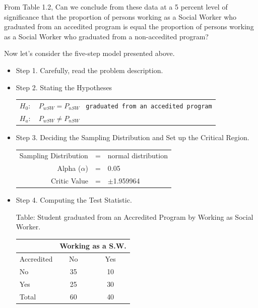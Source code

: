 \documentclass[11pt, chapterprefix=true]{scrbook}\usepackage[]{graphicx}\usepackage[]{color}
\begin{document}
From Table 1.2, Can we conclude from these data at a 5 percent level of significance that the proportion of persons working as a Social Worker who graduated from an accedited program is equal the proportion of persons working as a Social Worker who graduated from a non-accedited program?

Now let's consider the five-step model presented above.

\begin{itemize}
\item Step 1. Carefully, read the problem description.

\item Step 2. Stating the Hypotheses

\begin{center}
\begin{tabular}{@{} ll @{}}
$H_0:$ & $P_{wSW} = P_{nSW}$ \texttt{  graduated from an accedited program} \\
$H_a:$ & $P_{wSW} \ne P_{nSW}$  
\end{tabular}
\end{center}

\item Step 3. Deciding the Sampling Distribution and Set up the Critical Region.

\begin{tabular}{@{} rcl @{}}
Sampling Distribution & = & normal distribution \\
Alpha ($\alpha$)      & = & 0.05 \\
Critic Value          & = & $\pm$1.959964 
\end{tabular}

\newpage

\item Step 4.  Computing the Test Statistic.

\begin{minipage}[h]{6cm}

Table: Student graduated from an Accredited Program by Working as Social Worker.

      \begin{tabular}{@{} l c c @{}}  
     &  \multicolumn{2}{c}{ Working as a S.W. } \\ \hline
     Accredited   & No & Yes \\ \hline
     No           & 35 & 10 \\
     Yes          & 25 & 30 \\ \hline
     Total        & 60 & 40 \\ \hline
   \end{tabular}
   

\end{minipage}
\end{itemize}
\end{document}
